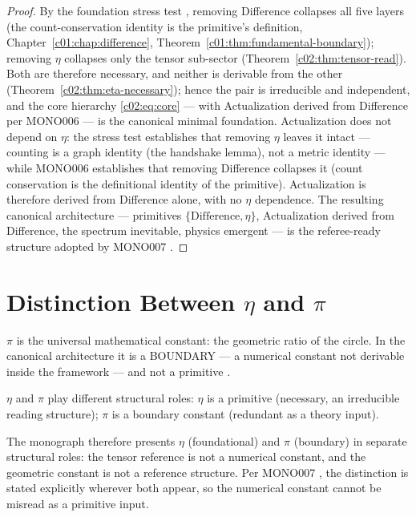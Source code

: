 \begin{proof}
By the foundation stress test \cite{c02:QG292}, removing Difference collapses all five layers
(the count-conservation identity is the primitive's definition, Chapter~\ref{c01:chap:difference},
Theorem~\ref{c01:thm:fundamental-boundary}); removing $\eta$ collapses only the tensor sub-sector
(Theorem~\ref{c02:thm:tensor-read}). Both are therefore necessary, and neither is derivable
from the other (Theorem~\ref{c02:thm:eta-necessary}); hence the pair is irreducible and
independent, and the core hierarchy \eqref{c02:eq:core} --- with Actualization derived from
Difference per MONO006 \cite{c02:MONO006} --- is the canonical minimal foundation.
Actualization does not depend on $\eta$: the stress test \cite{c02:QG292} establishes that
removing $\eta$ leaves it intact --- counting is a graph identity (the handshake lemma), not a
metric identity --- while MONO006 \cite{c02:MONO006} establishes that removing Difference
collapses it (count conservation is the definitional identity of the primitive). Actualization
is therefore derived from Difference alone, with no $\eta$ dependence. The resulting canonical
architecture --- primitives $\{\text{Difference},\eta\}$, Actualization derived from
Difference, the spectrum inevitable, physics emergent --- is the referee-ready structure
adopted by MONO007 \cite{c02:MONO007}.
\end{proof}

\section{Distinction Between \texorpdfstring{$\eta$}{eta} and \texorpdfstring{$\pi$}{pi}}
\label{c02:sec:eta-vs-pi}

\begin{definition}
\label{c02:def:pi}
\emph{$\pi$} is the universal mathematical constant: the geometric ratio of the circle. In
the canonical architecture it is a BOUNDARY --- a numerical constant not derivable inside the
framework --- and not a primitive \cite{c02:QG291}.
\end{definition}

\begin{theorem}
\label{c02:thm:eta-primitive-pi-boundary}
$\eta$ and $\pi$ play different structural roles: $\eta$ is a primitive (necessary, an
irreducible reading structure); $\pi$ is a boundary constant (redundant as a theory input).

The monograph therefore presents $\eta$ (foundational) and $\pi$ (boundary) in separate
structural roles: the tensor reference is not a numerical constant, and the geometric constant
is not a reference structure. Per MONO007 \cite{c02:MONO007}, the distinction is stated
explicitly wherever both appear, so the numerical constant cannot be misread as a primitive
input.
\end{theorem}

